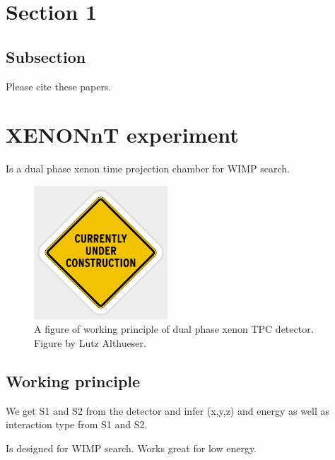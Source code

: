 \section{Section 1}
\subsection{Subsection}

Please cite these papers\cite{PhysRevLett.126.091301,PhysRevD.103.063028}.

\section{XENONnT experiment}

Is a dual phase xenon time projection chamber for WIMP search\cite{Aprile_2020}.

\begin{figure}[h!]
\begin{center}
\includegraphics[width=5cm]{figures/placeholder}
\end{center}
\caption{ A figure of working principle of dual phase xenon TPC detector. Figure by Lutz Althueser.  }\label{fig:1}
\end{figure}

\subsection{Working principle}
We get S1 and S2 from the detector and infer (x,y,z) and energy as well as interaction type from S1 and S2.

Is designed for WIMP search. Works great for low energy.
